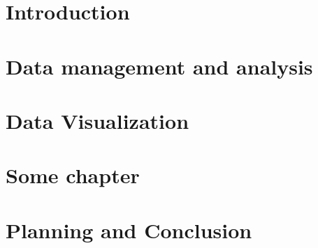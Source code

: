 \documentclass[10pt]{report}
\begin{document}


\doublespacing
 

\singlespacing          %


 \tableofcontents


 \chapter{Introduction}     %


\chapter{Data management and analysis}


 \chapter{Data Visualization}
 

  \chapter{Some chapter}
 
 
 \chapter{Planning and Conclusion}
 

    

\printbibliography
\end{document}
